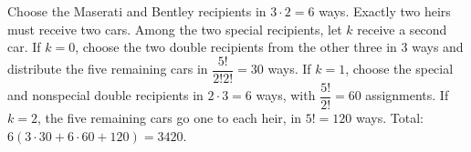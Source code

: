 Choose the Maserati and Bentley recipients in $3\cdot2=6$ ways. Exactly two heirs must receive two cars. Among the two special recipients, let $k$ receive a second car. If $k=0$, choose the two double recipients from the other three in $3$ ways and distribute the five remaining cars in $\dfrac{5!}{2!2!}=30$ ways. If $k=1$, choose the special and nonspecial double recipients in $2\cdot3=6$ ways, with $\dfrac{5!}{2!}=60$ assignments. If $k=2$, the five remaining cars go one to each heir, in $5!=120$ ways. Total: $6(3\cdot30+6\cdot60+120)=\boxed{3420}$.
